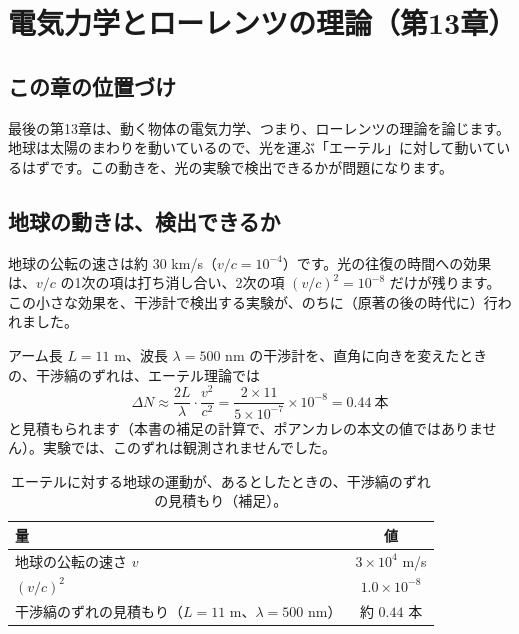 \documentclass[a4paper,11pt,openany]{ltjsbook}
\begin{document}
\chapter{電気力学とローレンツの理論（第13章）}

\section{この章の位置づけ}

最後の第13章は、動く物体の電気力学、つまり、ローレンツの理論を論じます。地球は太陽のまわりを動いているので、光を運ぶ「エーテル」に対して動いているはずです。この動きを、光の実験で検出できるかが問題になります。

\section{地球の動きは、検出できるか}

地球の公転の速さは約 $30$ km/s（$v/c=10^{-4}$）です。光の往復の時間への効果は、$v/c$ の1次の項は打ち消し合い、2次の項 $(v/c)^2=10^{-8}$ だけが残ります。この小さな効果を、干渉計で検出する実験が、のちに（原著の後の時代に）行われました。

アーム長 $L=11$ m、波長 $\lambda=500$ nm の干渉計を、直角に向きを変えたときの、干渉縞のずれは、エーテル理論では
\[
\Delta N\approx\frac{2L}{\lambda}\cdot\frac{v^2}{c^2}=\frac{2\times11}{5\times10^{-7}}\times10^{-8}=0.44\ \text{本}
\]
と見積もられます（本書の補足の計算で、ポアンカレの本文の値ではありません）。実験では、このずれは観測されませんでした。

\begin{table}[htbp]
\centering
\begin{tabular}{lc}
\toprule
量 & 値\\
\midrule
地球の公転の速さ $v$ & $3\times10^4$ m/s\\
$(v/c)^2$ & $1.0\times10^{-8}$\\
干渉縞のずれの見積もり（$L=11$ m、$\lambda=500$ nm） & 約 $0.44$ 本\\
\bottomrule
\end{tabular}
\caption{エーテルに対する地球の運動が、あるとしたときの、干渉縞のずれの見積もり（補足）。}
\end{table}
\end{document}

